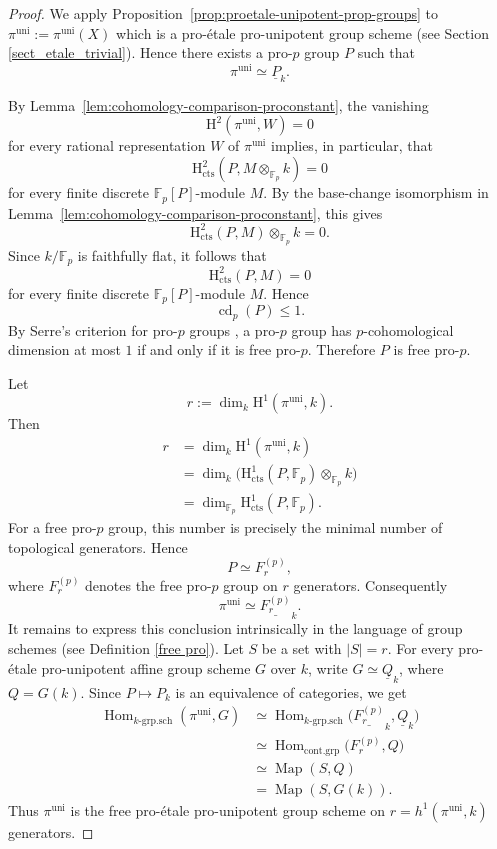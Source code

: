 \documentclass[12pt,a4]{amsart}
\theoremstyle{definition}
\begin{document}
\begin{proof}
	We apply Proposition~\ref{prop:proetale-unipotent-prop-groups} to
	$
	\pi^{\mathrm{uni}}:=\pi^{\mathrm{uni}}(X)
	$ which is a pro-\'etale pro-unipotent group scheme (see Section \ref{sect_etale_trivial}). Hence there
	exists a pro-\(p\) group \(P\) such that
	\[
	\pi^{\mathrm{uni}}\simeq \underline{P}_k.
	\]
	
	By Lemma~\ref{lem:cohomology-comparison-proconstant}, the vanishing
	\[
	\mathrm H^2(\pi^{\mathrm{uni}},W)=0
	\]
	for every rational representation \(W\) of \(\pi^{\mathrm{uni}}\) implies, in
	particular, that
	\[
	\mathrm H^2_{\mathrm{cts}}(P,M\otimes_{\mathbb F_p}k)=0
	\]
	for every finite discrete \(\mathbb F_p[P]\)-module \(M\). By the base-change
	isomorphism in Lemma~\ref{lem:cohomology-comparison-proconstant}, this gives
	\[
	\mathrm H^2_{\mathrm{cts}}(P,M)\otimes_{\mathbb F_p}k=0.
	\]
	Since \(k/\mathbb F_p\) is faithfully flat, it follows that
	\[
	\mathrm H^2_{\mathrm{cts}}(P,M)=0
	\]
	for every finite discrete \(\mathbb F_p[P]\)-module \(M\). Hence
	\[
	\operatorname{cd}_p(P)\leq 1.
	\]
	By Serre's criterion for pro-\(p\) groups
	\cite[Chapter I, Section 4]{SerreGalois}, a pro-\(p\) group has
	\(p\)-cohomological dimension at most \(1\) if and only if it is free
	pro-\(p\). Therefore \(P\) is free pro-\(p\).
	
	Let
	\[
	r:=\dim_k \mathrm H^1(\pi^{\mathrm{uni}},k).
	\]
	Then
	\[
	\begin{aligned}
		r
		&=
		\dim_k \mathrm H^1(\pi^{\mathrm{uni}},k) \\
		&=
		\dim_k\bigl(\mathrm H^1_{\mathrm{cts}}(P,\mathbb F_p)\otimes_{\mathbb F_p}k\bigr)\\
		&=
		\dim_{\mathbb F_p}\mathrm H^1_{\mathrm{cts}}(P,\mathbb F_p).
	\end{aligned}
	\]
	For a free pro-\(p\) group, this number is precisely the minimal number of
	topological generators. Hence
	\[
	P\simeq F^{(p)}_r,
	\]
	where \(F^{(p)}_r\) denotes the free pro-\(p\) group on \(r\) generators.
	Consequently
	\[
	\pi^{\mathrm{uni}}\simeq \underline{F^{(p)}_r}_k .
	\]
	It remains to express this conclusion intrinsically in the language of group
	schemes (see Definition \ref{free pro}). Let \(S\) be a set with \(|S|=r\). For every pro-\'etale
	pro-unipotent affine group scheme \(G\) over \(k\), write \(G\simeq \underline{Q}_k\), where
	\(Q=G(k)\). Since \(P\mapsto P_k\) is an equivalence of categories, we get
	\[
	\begin{aligned}
		\operatorname{Hom}_{k\text{-grp.sch}}(\pi^{\mathrm{uni}},G)
		&\simeq
		\operatorname{Hom}_{k\text{-grp.sch}}\bigl( \underline{F^{(p)}_r}_k,\underline{Q}_k\bigr) \\
		&\simeq
		\operatorname{Hom}_{\mathrm{cont.grp}}\bigl(F^{(p)}_r,Q\bigr) \\
		&\simeq
		\operatorname{Map}(S,Q) \\
		&=
		\operatorname{Map}(S,G(k)).
	\end{aligned}
	\]
	Thus \(\pi^{\mathrm{uni}}\) is the free pro-\'etale pro-unipotent group scheme
	on \(r=h^1(\pi^{\mathrm{uni}},k)\) generators.
\end{proof}
\end{document}
